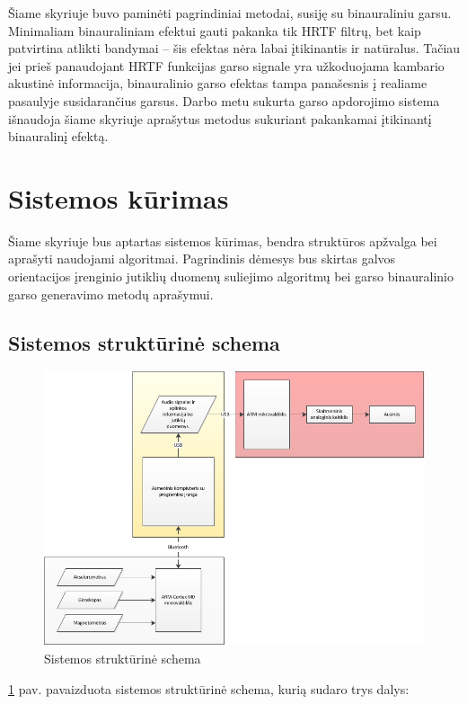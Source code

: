 \documentclass[]{vgtuef}
\begin{document}
Šiame skyriuje buvo paminėti pagrindiniai metodai, susiję su binauraliniu garsu. Minimaliam binauraliniam efektui gauti pakanka tik HRTF filtrų, bet kaip patvirtina atlikti bandymai -- šis efektas nėra labai įtikinantis ir natūralus. Tačiau jei prieš panaudojant HRTF funkcijas garso signale yra užkoduojama kambario akustinė informacija, binauralinio garso efektas tampa panašesnis į realiame pasaulyje susidarančius garsus. 
Darbo metu sukurta garso apdorojimo sistema išnaudoja šiame skyriuje aprašytus metodus sukuriant pakankamai įtikinantį binauralinį efektą.

\section{Sistemos kūrimas}

Šiame skyriuje bus aptartas sistemos kūrimas, bendra struktūros apžvalga bei aprašyti naudojami algoritmai. Pagrindinis dėmesys bus skirtas galvos orientacijos įrenginio jutiklių duomenų suliejimo algoritmų bei garso binauralinio garso generavimo metodų aprašymui.

\subsection{Sistemos struktūrinė schema}

\begin{figure}[!h]
  \centering
  \includegraphics[width=500px]{img/schema.png}
  \caption{Sistemos struktūrinė schema}
  \label{fig:full_schematic}
\end{figure}

\ref{fig:full_schematic} pav. pavaizduota sistemos struktūrinė schema, kurią sudaro trys dalys:
\end{document}
